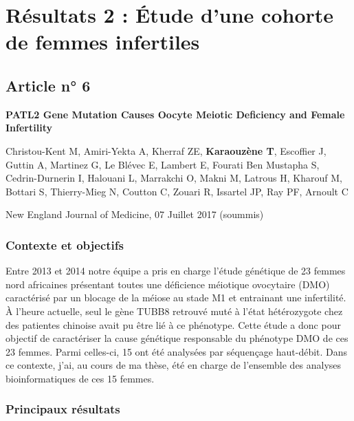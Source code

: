 \documentclass[12pt,twoside]{ugathesis}
\begin{document}
\newpage

\section{Résultats 2 : Étude d'une cohorte de femmes
infertiles}\label{resultats-2-etude-dune-cohorte-de-femmes-infertiles}

\subsection{Article n° 6}\label{article-n-6}

\textbf{PATL2 Gene Mutation Causes Oocyte Meiotic Deficiency and Female
Infertility}

Christou-Kent M, Amiri-Yekta A, Kherraf ZE, \textbf{Karaouzène T},
Escoffier J, Guttin A, Martinez G, Le Blévec E, Lambert E, Fourati Ben
Mustapha S, Cedrin-Durnerin I, Halouani L, Marrakchi O, Makni M, Latrous
H, Kharouf M, Bottari S, Thierry-Mieg N, Coutton C, Zouari R, Issartel
JP, Ray PF, Arnoult C

New England Journal of Medicine, 07 Juillet 2017 (soummis)

\newpage

\subsubsection{Contexte et objectifs}\label{contexte-et-objectifs-3}

Entre 2013 et 2014 notre équipe a pris en charge l'étude génétique de 23
femmes nord africaines présentant toutes une déficience méiotique
ovocytaire (DMO) caractérisé par un blocage de la méiose au stade M1 et
entrainant une infertilité. À l'heure actuelle, seul le gène TUBB8
retrouvé muté à l'état hétérozygote chez des patientes chinoise avait pu
être lié à ce phénotype. Cette étude a donc pour objectif de
caractériser la cause génétique responsable du phénotype DMO de ces 23
femmes. Parmi celles-ci, 15 ont été analysées par séquençage haut-débit.
Dans ce contexte, j'ai, au cours de ma thèse, été en charge de
l'ensemble des analyses bioinformatiques de ces 15 femmes.

\newpage



\newpage

\subsubsection{Principaux résultats}\label{principaux-resultats-3}
\end{document}

